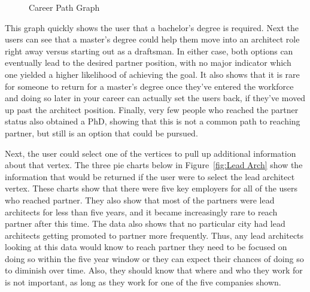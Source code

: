 \begin{figure}[H]
{
}

	\caption{Career Path Graph}
	\label{fig:partner nodal map}
\end{figure}

This graph quickly shows the user that a bachelor's degree is required.  Next
the users can see that a master's degree could help them move into an architect
role right away versus starting out as a draftsman.  In either case, both
options can eventually lead to the desired partner position, with no major
indicator which one yielded a higher likelihood of achieving the goal.  It also
shows that it is rare for someone to return for a master's degree once they've
entered the workforce and doing so later in your career can actually set the
users back, if they've moved up past the architect position.  Finally, very
few people who reached the partner status also obtained a PhD, showing that this
is not a common path to reaching partner, but still is an option that could be
pursued.

Next, the user could select one of the vertices to pull up additional
information about that vertex.  The three pie charts below in
Figure~\ref{fig:Lead Arch} show the information that would be returned if the user were to select the lead
architect vertex.  These charts show that there were five key employers for all of
the users who reached partner.  They also show that most of the partners were
lead architects for less than five years, and it became increasingly rare to
reach partner after this time.  The data also shows that no particular city had
lead architects getting promoted to partner more frequently.  Thus, any lead
architects looking at this data would know to reach partner they need to be
focused on doing so within the five year window or they can expect their chances
of doing so to diminish over time.  Also, they should know that where and who
they work for is not important, as long as they work for one of the five
companies shown.

